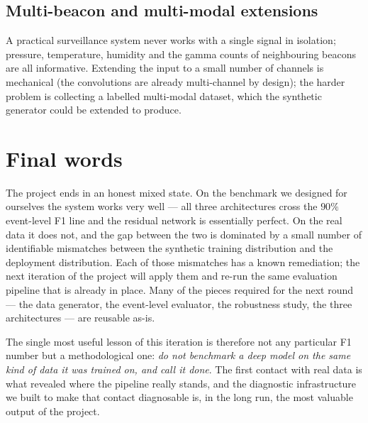 \subsection{Multi-beacon and multi-modal extensions}

A practical surveillance system never works with a single signal in
isolation; pressure, temperature, humidity and the gamma counts of
neighbouring beacons are all informative. Extending the input to a
small number of channels is mechanical (the convolutions are already
multi-channel by design); the harder problem is collecting a labelled
multi-modal dataset, which the synthetic generator could be extended
to produce.

\section{Final words}
\label{sec:conc-final}

The project ends in an honest mixed state. On the benchmark we
designed for ourselves the system works very well --- all three
architectures cross the $90\%$ event-level F1 line and the residual
network is essentially perfect. On the real data it does not, and the
gap between the two is dominated by a small number of identifiable
mismatches between the synthetic training distribution and the
deployment distribution. Each of those mismatches has a known
remediation; the next iteration of the project will apply them and
re-run the same evaluation pipeline that is already in place. Many of
the pieces required for the next round --- the data generator, the
event-level evaluator, the robustness study, the three architectures
--- are reusable as-is.

The single most useful lesson of this iteration is therefore not any
particular F1 number but a methodological one: \emph{do not benchmark
a deep model on the same kind of data it was trained on, and call it
done}. The first contact with real data is what revealed where the
pipeline really stands, and the diagnostic infrastructure we built to
make that contact diagnosable is, in the long run, the most valuable
output of the project.
